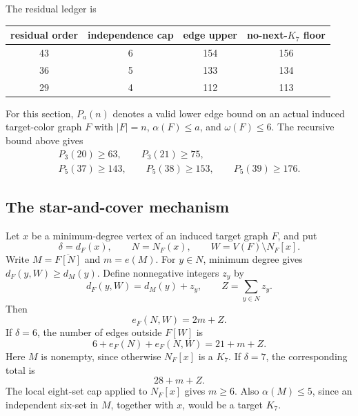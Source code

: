 \documentclass[11pt,reqno,a4paper]{amsart}
\theoremstyle{definition}
\theoremstyle{remark}
\newcommand{\comp}[1]{\overline{#1}}
\begin{document}
The residual ledger is
\begin{center}
\begin{tabular}{c@{\qquad}c@{\qquad}c@{\qquad}c}
\toprule
residual order&independence cap&edge upper&no-next-$K_7$ floor\\
\midrule
43&6&154&156\\
36&5&133&134\\
29&4&112&113\\
\bottomrule
\end{tabular}
\end{center}

For this section, $P_a(n)$ denotes a valid lower edge bound on an actual
induced target-color graph $F$ with $|F|=n$, $\alpha(F)\leq a$, and
$\omega(F)\leq6$. The recursive bound above gives
\begin{equation}\label{eq:r7-input-floors}
\begin{gathered}
 P_3(20)\geq63,\qquad P_3(21)\geq75,\\
 P_5(37)\geq143,\qquad P_5(38)\geq153,
 \qquad P_5(39)\geq176.
\end{gathered}
\end{equation}

\subsection{The star-and-cover mechanism}

Let $x$ be a minimum-degree vertex of an induced target graph $F$, and
put
\[
 \delta=d_F(x),\qquad N=N_F(x),
 \qquad W=V(F)\setminus N_F[x].
\]
Write $M=\comp{F[N]}$ and $m=e(M)$. For $y\in N$, minimum degree
gives $d_F(y,W)\geq d_M(y)$. Define nonnegative integers $z_y$ by
\[
 d_F(y,W)=d_M(y)+z_y,
 \qquad Z=\sum_{y\in N}z_y.
\]
Then
\begin{equation}\label{eq:r7-cross-count}
 e_F(N,W)=2m+Z.
\end{equation}
If $\delta=6$, the number of edges outside $F[W]$ is
\begin{equation}\label{eq:r7-star6}
 6+e_F(N)+e_F(N,W)=21+m+Z.
\end{equation}
Here $M$ is nonempty, since otherwise $N_F[x]$ is a $K_7$. If
$\delta=7$, the corresponding total is
\begin{equation}\label{eq:r7-star7}
 28+m+Z.
\end{equation}
The local eight-set cap applied to $N_F[x]$ gives $m\geq6$. Also
$\alpha(M)\leq5$, since an independent six-set in $M$, together with
$x$, would be a target $K_7$.
\end{document}
